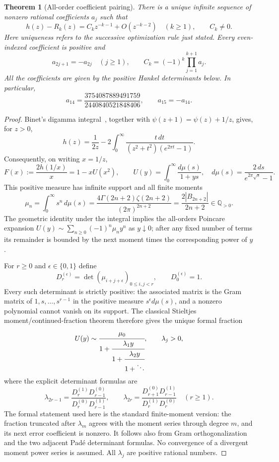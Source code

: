 \documentclass[11pt,a4paper]{article}
\newtheorem{theorem}{Theorem}[section]
\theoremstyle{definition}
\theoremstyle{remark}
\numberwithin{equation}{section}
\begin{document}
\begin{theorem}[All-order coefficient pairing]\label{p3:thm:xu-pairing}
There is a unique infinite sequence of nonzero rational coefficients
$a_j$ such that
\[
 h(z)-R_k(z)=C_kz^{-k-1}+O(z^{-k-2})\quad(k\geq1),\qquad C_k\ne0.
\]
Here uniqueness refers to the successive optimization rule just stated.
Every even-indexed coefficient is positive and
\[
 a_{2j+1}=-a_{2j}\quad(j\geq1),\qquad
 C_k=(-1)^k\prod_{j=1}^{k+1}a_j.
\]
All the coefficients are given by the positive Hankel determinants below.
In particular,
\[
 a_{14}=\frac{3754087889491759}{2440840521848406},\qquad
 a_{15}=-a_{14}.
\]
\end{theorem}

\begin{proof}
Binet's digamma integral~\cite[5.9.15]{p3:DLMF}, together with
$\psi(z+1)=\psi(z)+1/z$, gives, for $z>0$,
\[
 h(z)=\frac1{2z}-2\int_0^\infty
       \frac{t\,dt}{(z^2+t^2)(e^{2\pi t}-1)}.
\]
Consequently, on writing $x=1/z$,
\begin{equation}\label{p3:eq:xy-stieltjes}
 F(x):=\frac{2h(1/x)}x=1-xU(x^2),\qquad
 U(y)=\int_0^\infty\frac{d\mu(s)}{1+ys},\quad
 d\mu(s)=\frac{2\,ds}{e^{2\pi\sqrt{s}}-1}.
\end{equation}
This positive measure has infinite support and all finite moments
\[
 \mu_n=\int_0^\infty s^n\,d\mu(s)
 =\frac{4\Gamma(2n+2)\zeta(2n+2)}{(2\pi)^{2n+2}}
 =\frac{2|B_{2n+2}|}{2n+2}\in\mathbb Q_{>0}.
\]
The geometric identity under the integral implies the all-orders
Poincare expansion $U(y)\sim\sum_{n\geq0}(-1)^n\mu_ny^n$ as
$y\downarrow0$; after any fixed number of terms its remainder is bounded
by the next moment times the corresponding power of $y$.

For $r\geq0$ and $\epsilon\in\{0,1\}$ define
\[
 D_r^{(\epsilon)}=\det(\mu_{i+j+\epsilon})_{0\leq i,j<r},
 \qquad D_0^{(\epsilon)}=1.
\]
Every such determinant is strictly positive: the associated matrix is
the Gram matrix of $1,s,\ldots,s^{r-1}$ in the positive measure
$s^\epsilon d\mu(s)$, and a nonzero polynomial cannot vanish on its
support.  The classical Stieltjes moment/continued-fraction theorem
\cite{p3:Stieltjes1894,p3:Wall1948} therefore gives the unique formal fraction
\begin{equation}\label{p3:eq:xy-positive-cf}
 U(y)\sim\cfrac{\mu_0}{1+\cfrac{\lambda_1y}{1+
                  \cfrac{\lambda_2y}{1+\ddots}}},\qquad \lambda_j>0,
\end{equation}
where the explicit determinant formulas are
\[
 \lambda_{2r-1}=\frac{D_r^{(1)}D_{r-1}^{(0)}}
                         {D_r^{(0)}D_{r-1}^{(1)}},\qquad
 \lambda_{2r}=\frac{D_{r+1}^{(0)}D_{r-1}^{(1)}}
                       {D_r^{(1)}D_r^{(0)}}\quad(r\geq1).
\]
The formal statement used here is the standard finite-moment version:
the fraction truncated after $\lambda_m$ agrees with the moment series
through degree $m$, and its next error coefficient is nonzero.  It follows
also from Gram orthogonalization and the two adjacent Pad\'e determinant
formulas.  No convergence of a divergent moment power series is assumed.
All $\lambda_j$ are positive rational numbers.


\end{proof}
\end{document}
